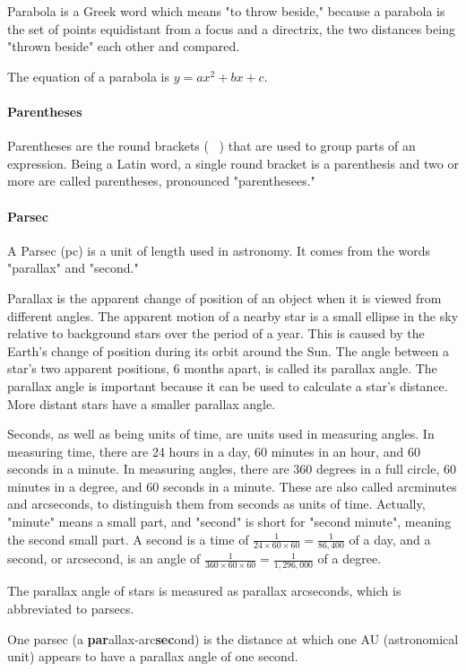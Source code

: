 \documentclass[12pt]{article}
\begin{document}
{Parabola is a Greek word which means "to throw beside," because a parabola is the set of points equidistant from a focus and a directrix, the two distances being "thrown beside" each other and compared.

The equation of a parabola is $y = ax^2 + bx + c$.

\paragraph{Parentheses}
Parentheses are the round brackets ( \ ) that are used to group parts of an expression. Being a Latin word, a single round bracket is a parenthesis and two or more are called parentheses, pronounced "parenthesees."

\paragraph{Parsec} A Parsec (pc) is a unit of length used in astronomy. It comes from the words "parallax" and "second."

Parallax is the apparent change of position of an object when it is viewed from different angles. The apparent motion of a nearby star is a small ellipse in the sky relative to background stars over the period of a year. This is caused by the Earth's change of position during its orbit around the Sun. The angle between a star's two apparent positions, 6 months apart, is called its parallax angle. The parallax angle is important because it can be used to calculate a star's distance. More distant stars have a smaller parallax angle.

Seconds, as well as being units of time, are units used in  measuring angles. In measuring time, there are 24 hours in a day, 60 minutes in an hour, and 60 seconds in a minute. In measuring angles, there are 360 degrees in a full circle, 60 minutes in a degree, and 60 seconds in a minute. These are also called arcminutes and arcseconds, to distinguish them from seconds as units of time. Actually, "minute" means a small part, and "second" is short for "second minute", meaning the second small part. A second is a time of $\frac{1}{24\times60\times60} = \frac{1}{86,400}$ of a day, and a second, or arcsecond, is an angle of $\frac{1}{360\times60\times60}=\frac{1}{1,296,000}$ of a degree.

The parallax angle of stars is measured as parallax arcseconds, which is abbreviated to parsecs.

One parsec (a \textbf{par}allax-arc\textbf{sec}ond) is the distance at which one AU (astronomical unit) appears to have a parallax angle of one second.

}
\end{document}
